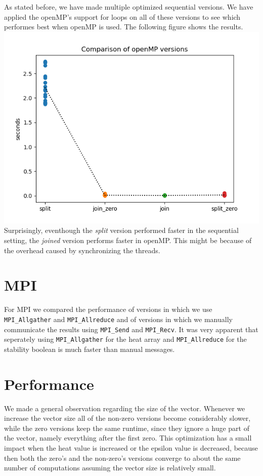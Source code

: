 \documentclass[a4paper]{article}
\begin{document}
As stated before, we have made multiple optimized sequential versions. We have applied the openMP's support for loops on all of these versions to see which performes best when openMP is used. The following figure shows the results. \\
\includegraphics[scale = 0.5]{graphs/Comparison of openMP versions.png}\\
\noindent Surprisingly, eventhough the \textit{split} version performed faster in the sequential setting, the \textit{joined} version performs faster in openMP.
This might be because of the overhead caused by synchronizing the threads.

\section{MPI}
For MPI we compared the performance of versions in which  we use \texttt{MPI\_Allgather}
and \texttt{MPI\_Allreduce} and of versions in which we manually communicate the results using \texttt{MPI\_Send} and \texttt{MPI\_Recv}. It was very apparent that seperately using \texttt{MPI\_Allgather} for the heat array and \texttt{MPI\_Allreduce} for the stability boolean is much faster than manual messages.

\section{Performance}
We made a general observation regarding the size of the vector. Whenever we increase the vector size all of the non-zero versions become considerably slower, while the zero versions keep the same runtime, since they ignore a huge part of the vector, namely everything after the first zero. This optimization has a small impact when the heat value is increased or the epsilon value is decreased, because then both the zero's and the non-zero's versions converge to about the same number of computations assuming the vector size is relatively small.
\end{document}
